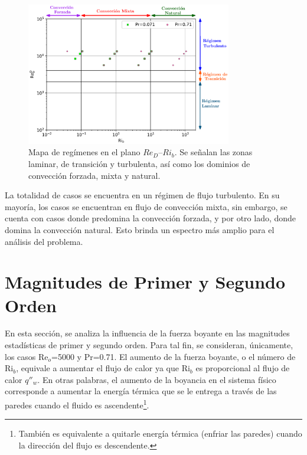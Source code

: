 \begin{figure}[H]
  \centering
    \includegraphics[width=0.8\textwidth]{figures/cap5/map.eps}
  \caption{Mapa de regímenes en el plano $Re_D$–$Ri_b$. Se señalan las zonas laminar, de transición y turbulenta, así como los dominios de convección forzada, mixta y natural.}
  \label{fig:map_flow_regime}
\end{figure}

La totalidad de casos se encuentra en un régimen de flujo turbulento. En su mayoría, los casos se encuentran en flujo de convección mixta, sin embargo, se cuenta con casos donde predomina la convección forzada, y por otro lado, donde domina la convección natural. Esto brinda un espectro más amplio para el análisis del problema.









\section{Magnitudes de Primer y Segundo Orden}

En esta sección, se analiza la influencia de la fuerza boyante en las magnitudes estadísticas de primer y segundo orden. Para tal fin, se consideran, únicamente, los casos Re$_o$=5000 y Pr=0.71. El aumento de la fuerza boyante, o el número de Ri$_b$, equivale a aumentar el flujo de calor ya que Ri$_b$ es proporcional al flujo de calor $q''_w$. En otras palabras, el aumento de la boyancia en el sistema físico corresponde a aumentar la energía térmica que se le entrega a través de las paredes cuando el fluido es ascendente\footnote{También es equivalente a quitarle energía térmica (enfriar las paredes) cuando la dirección del flujo es descendente.}.



